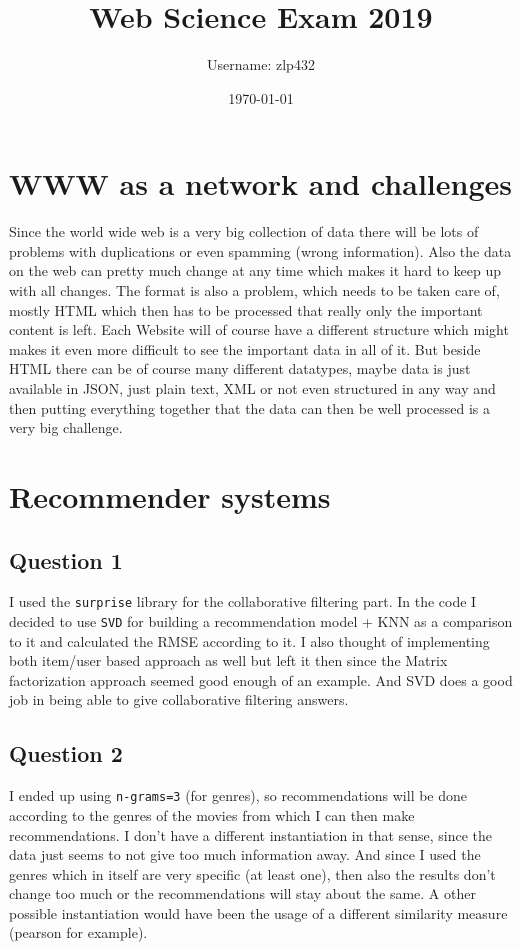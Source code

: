 \documentclass[11pt,a4paper]{article}
\begin{document}
\title{Web Science Exam 2019}

\author{Username: zlp432}
\date{\today}
	
\maketitle
\tableofcontents

\section{WWW as a network and challenges}

Since the world wide web is a very big collection of data there will be lots of problems with duplications or even spamming (wrong information).
Also the data on the web can pretty much change at any time which makes it hard to keep up with all changes. 
The format is also a problem, which needs to be taken care of, mostly HTML which then has to be processed that really only the important content is left.
Each Website will of course have a different structure which might makes it even more difficult to see the important data in all of it.
But beside HTML there can be of course many different datatypes, maybe data is just available in JSON, just plain text, XML or not even structured in any way and then putting everything together that the data can then be well processed is a very big challenge.




\section{Recommender systems}

\subsection{Question 1}
I used the \texttt{surprise} library for the collaborative filtering part.
In the code I decided to use \texttt{SVD} for building a recommendation model + KNN as a comparison to it and calculated the RMSE according to it.
I also thought of implementing both item/user based approach as well but left it then since the Matrix factorization approach seemed good enough of an example.
And SVD does a good job in being able to give collaborative filtering answers.

\subsection{Question 2}
I ended up using \texttt{n-grams=3} (for genres), so recommendations will be done according to the genres of the movies from which I can then make recommendations.
I don't have a different instantiation in that sense, since the data just seems to not give too much information away.
And since I used the genres which in itself are very specific (at least one), then also the results don't change too much or the recommendations will stay about the same.
A other possible instantiation would have been the usage of a different similarity measure (pearson for example).
\end{document}
